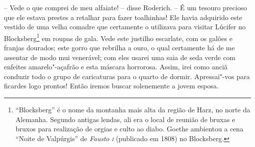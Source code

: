 -- Vede o que comprei de meu alfaiate! -- disse Roderich. -- É um
tesouro precioso que ele estava prestes a retalhar para fazer
toalhinhas! Ele havia adquirido este vestido de uma velha comadre que
certamente o utilizava para visitar Lúcifer no Blocksberg\footnote{
``Blocksberg'' é o nome da montanha mais alta da região de Harz, no norte
da Alemanha. Segundo antigas lendas, ali era o local de reunião de
bruxas e bruxos para realização de orgias e culto ao diabo. Goethe
ambientou a cena ``Noite de Valpúrgis'' de \textit{Fausto \textsc{i}} (publicado em
1808) no Blocksberg.} em roupas de gala. Vede este justilho
escarlate, com os galões e franjas dourados; este gorro que rebrilha a
ouro, o qual certamente há de me assentar de modo mui venerável; com
eles usarei uma saia de seda verde com enfeites amarelo"-açafrão e esta
máscara horrorosa. Assim, irei como anciã conduzir todo o grupo de
caricaturas para o quarto de dormir. Apressai"-vos para ficardes logo
prontos! Então iremos buscar solenemente a jovem esposa.

